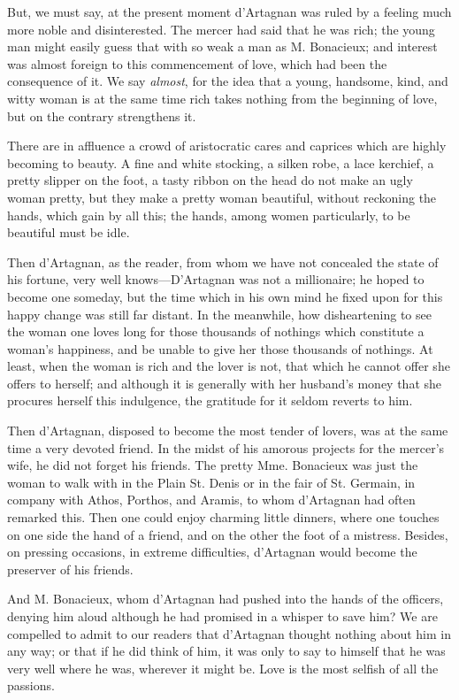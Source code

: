 But, we must say, at the present moment d'Artagnan was ruled by a feeling much more noble and disinterested. The mercer had said that he was rich; the young man might easily guess that with so weak a man as M. Bonacieux; and interest was almost foreign to this commencement of love, which had been the consequence of it. We say \textit{almost}, for the idea that a young, handsome, kind, and witty woman is at the same time rich takes nothing from the beginning of love, but on the contrary strengthens it. 

There are in affluence a crowd of aristocratic cares and caprices which are highly becoming to beauty. A fine and white stocking, a silken robe, a lace kerchief, a pretty slipper on the foot, a tasty ribbon on the head do not make an ugly woman pretty, but they make a pretty woman beautiful, without reckoning the hands, which gain by all this; the hands, among women particularly, to be beautiful must be idle. 

Then d'Artagnan, as the reader, from whom we have not concealed the state of his fortune, very well knows---D'Artagnan was not a millionaire; he hoped to become one someday, but the time which in his own mind he fixed upon for this happy change was still far distant. In the meanwhile, how disheartening to see the woman one loves long for those thousands of nothings which constitute a woman's happiness, and be unable to give her those thousands of nothings. At least, when the woman is rich and the lover is not, that which he cannot offer she offers to herself; and although it is generally with her husband's money that she procures herself this indulgence, the gratitude for it seldom reverts to him. 

Then d'Artagnan, disposed to become the most tender of lovers, was at the same time a very devoted friend. In the midst of his amorous projects for the mercer's wife, he did not forget his friends. The pretty Mme. Bonacieux was just the woman to walk with in the Plain St. Denis or in the fair of St. Germain, in company with Athos, Porthos, and Aramis, to whom d'Artagnan had often remarked this. Then one could enjoy charming little dinners, where one touches on one side the hand of a friend, and on the other the foot of a mistress. Besides, on pressing occasions, in extreme difficulties, d'Artagnan would become the preserver of his friends. 

And M. Bonacieux, whom d'Artagnan had pushed into the hands of the officers, denying him aloud although he had promised in a whisper to save him? We are compelled to admit to our readers that d'Artagnan thought nothing about him in any way; or that if he did think of him, it was only to say to himself that he was very well where he was, wherever it might be. Love is the most selfish of all the passions. 

